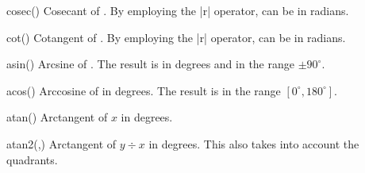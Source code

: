 \begin{math-function}{cosec()}
\mathcommand
    Cosecant of . By employing the |r| operator,  can be in
    radians.
\begin{codeexample}[]
 \pgfmathresult
\end{codeexample}
\end{math-function}

\begin{math-function}{cot()}
\mathcommand
    Cotangent of . By employing the |r| operator,  can be in
    radians.
\begin{codeexample}[]
 \pgfmathresult
\end{codeexample}
\end{math-function}

\begin{math-function}{asin()}
\mathcommand
    Arcsine of . The result is in degrees and in the range $\pm90^\circ$.
\begin{codeexample}[]
 \pgfmathresult
\end{codeexample}
\end{math-function}

\begin{math-function}{acos()}
\mathcommand
    Arccosine of  in degrees. The result is in the range $[0^\circ,180^\circ]$.
\begin{codeexample}[]
 \pgfmathresult
\end{codeexample}
\end{math-function}

\begin{math-function}{atan()}
\mathcommand
    Arctangent of $x$ in degrees.
\begin{codeexample}[]
 \pgfmathresult
\end{codeexample}
\end{math-function}

\begin{math-function}{atan2(,)}
    Arctangent of $y\div x$ in degrees. This also takes into account the
    quadrants.
\begin{codeexample}[]
 \pgfmathresult
\end{codeexample}
\end{math-function}

